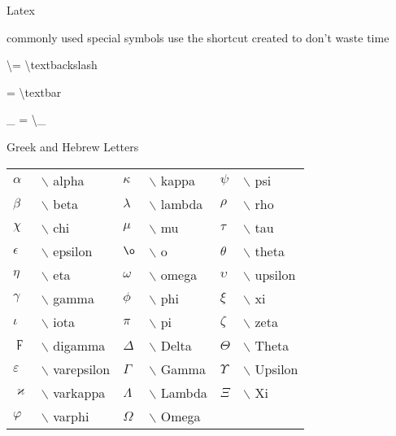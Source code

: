 \begin{section}{Latex}
	\begin{subsection}{commonly used special symbols}
		use the shortcut created to don't waste time

		\textbackslash = \textbackslash textbackslash

		\textbar = \textbackslash textbar

		\_ = \textbackslash \_
	\end{subsection}

	\begin{subsection}{Greek and Hebrew Letters}
		\begin{tabular}{ |m{1cm}m{3cm}|m{1cm}m{3cm}|m{1cm}m{3cm}| }
			\hline
			$\alpha$ & $\backslash$ alpha &
			$\kappa$ & $\backslash$ kappa &
			$\psi$ & $\backslash$ psi \\
	
			$\beta$ & $\backslash$ beta &
			$\lambda$ & $\backslash$ lambda &
			$\rho$ & $\backslash$ rho \\
			
			$\chi$ & $\backslash$ chi &
			$\mu$ & $\backslash$ mu &
			$\tau$ & $\backslash$ tau \\
	
			$\epsilon$ & $\backslash$ epsilon &
			$\o$ & $\backslash$ o &
			$\theta$ & $\backslash$ theta \\
	
			$\eta$ & $\backslash$ eta &
			$\omega$ & $\backslash$ omega &
			$\upsilon$ & $\backslash$ upsilon \\
	
			$\gamma$ & $\backslash$ gamma &
			$\phi$ & $\backslash$ phi &
			$\xi$ & $\backslash$ xi \\
	
			$\iota$ & $\backslash$ iota &
			$\pi$ & $\backslash$ pi &
			$\zeta$ & $\backslash$ zeta \\
	
			$\digamma$ & $\backslash$ digamma &
			$\Delta$ & $\backslash$ Delta &
			$\Theta$ & $\backslash$ Theta \\
	
			$\varepsilon$ & $\backslash$ varepsilon &
			$\Gamma$ & $\backslash$ Gamma &
			$\Upsilon$ & $\backslash$ Upsilon \\
	
			$\varkappa$ & $\backslash$ varkappa &
			$\Lambda$ & $\backslash$ Lambda &
			$\Xi$ & $\backslash$ Xi \\
	
			$\varphi$ & $\backslash$ varphi &
			$\Omega$ & $\backslash$ Omega &
			 &  \\
	

\end{tabular}
\end{subsection}
\end{section}
